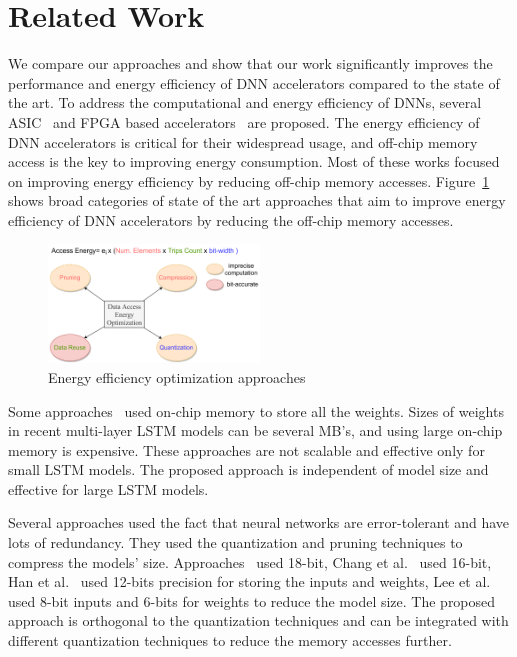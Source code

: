 \documentclass[a4paper,10pt]{article}
\begin{document}
\section{Related Work}
We compare our approaches and show that our work significantly improves the performance and energy efficiency of DNN accelerators compared to the state of the art. To address the computational and energy efficiency of DNNs, several ASIC~\cite{conti2018chipmunk,wang2017accelerating,azari2020elsa} and FPGA based accelerators~\cite{chang2015recurrent,ferreira2016fpga,lee2016fpga,guan2017fpga,han2017ese} are proposed. The energy efficiency of DNN accelerators is critical for their widespread usage, and off-chip memory access is the key to improving energy consumption. Most of these works focused on improving energy efficiency by reducing off-chip memory accesses. Figure~\ref{fig:dataEnergyRelatedWork} shows broad categories of state of the art approaches that aim to improve energy efficiency of DNN accelerators by reducing the off-chip memory accesses.
\begin{figure}[!htb]
	\centering
	\includegraphics[width=0.5\textwidth]{./images/dataEnergyOptRelatedWork}
	\caption{Energy efficiency optimization approaches}
	\label{fig:dataEnergyRelatedWork}
\end{figure}

Some approaches~\cite{lee2016fpga, rybalkin2018finn, ferreira2016fpga} used on-chip memory to store all the weights. Sizes of weights in recent multi-layer LSTM models can be several MB's, and using large on-chip memory is expensive. These approaches are not scalable and effective only for small LSTM models. The proposed approach is independent of model size and effective for large LSTM models.

Several approaches used the fact that neural networks are error-tolerant and have lots of redundancy. They used the quantization and pruning techniques to compress the models' size. Approaches~\cite{ferreira2016fpga,wang2018c} used 18-bit, Chang et al.~\cite{chang2015recurrent} used 16-bit, Han et al.~\cite{han2017ese} used 12-bits precision for storing the inputs and weights, Lee et al.~\cite{lee2016fpga} used 8-bit inputs and 6-bits for weights to reduce the model size. The proposed approach is orthogonal to the quantization techniques and can be integrated with different quantization techniques to reduce the memory accesses further. 
\end{document}

